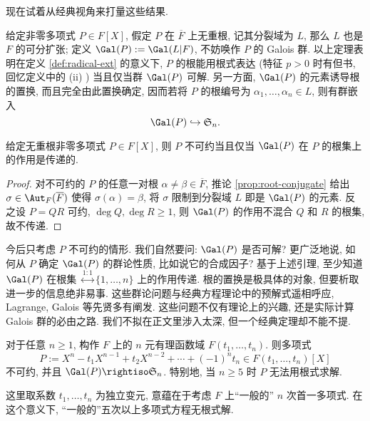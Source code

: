 现在试着从经典视角来打量这些结果.

给定非零多项式 $P \in F[X]$, 假定 $P$ 在 $\overline{F}$ 上无重根, 记其分裂域为 $L$, 那么 $L$ 也是 $F$ 的可分扩张; 定义 $\Gal(P) := \Gal(L|F)$, 不妨唤作 $P$ 的 Galois 群. 以上定理表明在定义 \ref{def:radical-ext} 的意义下, $P$ 的根能用根式表达 (特征 $p > 0$ 时有但书, 回忆定义中的 (ii) ) 当且仅当群 $\Gal(P)$ 可解. 另一方面, $\Gal(P)$ 的元素诱导根的置换, 而且完全由此置换确定, 因而若将 $P$ 的根编号为 $\alpha_1, \ldots, \alpha_n \in L$, 则有群嵌入
\[ \Gal(P) \hookrightarrow \mathfrak{S}_n. \]

\begin{lemma}\label{prop:mult-root-transitivity}
	给定无重根非零多项式 $P \in F[X]$, 则 $P$ 不可约当且仅当 $\Gal(P)$ 在 $P$ 的根集上的作用是传递的.
\end{lemma}
\begin{proof}
	对不可约的 $P$ 的任意一对根 $\alpha \neq \beta \in \overline{F}$, 推论 \ref{prop:root-conjugate} 给出 $\sigma \in \Aut_F(\overline{F})$ 使得 $\sigma(\alpha) = \beta$, 将 $\sigma$ 限制到分裂域 $L$ 即是 $\Gal(P)$ 的元素. 反之设 $P = QR$ 可约, $\deg Q, \deg R \geq 1$, 则 $\Gal(P)$ 的作用不混合 $Q$ 和 $R$ 的根集, 故不传递.
\end{proof}

今后只考虑 $P$ 不可约的情形. 我们自然要问: $\Gal(P)$ 是否可解? 更广泛地说, 如何从 $P$ 确定 $\Gal(P)$ 的群论性质, 比如说它的合成因子? 基于上述引理, 至少知道 $\Gal(P)$ 在根集 $\stackrel{1:1}{\longleftrightarrow} \{1, \ldots, n\}$ 上的作用传递. 根的置换是极具体的对象, 但要析取进一步的信息绝非易事. 这些群论问题与经典方程理论中的预解式遥相呼应, Lagrange, Galois 等先贤多有阐发. 这些问题不仅有理论上的兴趣, 还是实际计算 Galois 群的必由之路. 我们不拟在正文里涉入太深, 但一个经典定理却不能不提.

\begin{theorem}\label{prop:Abel-Ruffini}
	对于任意 $n \geq 1$, 构作 $F$ 上的 $n$ 元有理函数域 $F(t_1, \ldots, t_n)$. 则多项式
	\[ P := X^n - t_1 X^{n-1} + t_2 X^{n-2} + \cdots + (-1)^n t_n \in F(t_1, \ldots, t_n)[X] \]
	不可约, 并且 $\Gal(P) \rightiso \mathfrak{S}_n$. 特别地, 当 $n \geq 5$ 时 $P$ 无法用根式求解.
\end{theorem}
这里取系数 $t_1, \ldots, t_n$ 为独立变元, 意蕴在于考虑 $F$ 上``一般的'' $n$ 次首一多项式. 在这个意义下, ``一般的''五次以上多项式方程无根式解.

